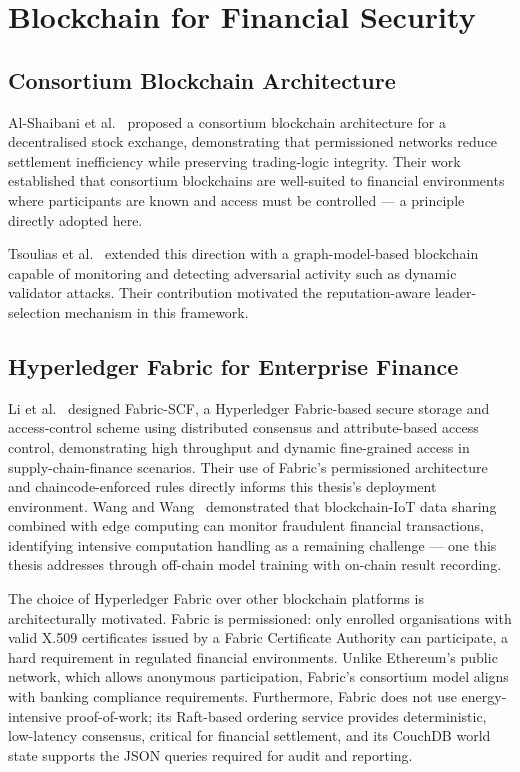 \section{Blockchain for Financial Security}

\subsection{Consortium Blockchain Architecture}

Al-Shaibani et al.~\cite{abdallah2020} proposed a consortium blockchain architecture for a decentralised stock exchange, demonstrating that permissioned networks reduce settlement inefficiency while preserving trading-logic integrity. Their work established that consortium blockchains are well-suited to financial environments where participants are known and access must be controlled --- a principle directly adopted here.

Tsoulias et al.~\cite{tsoulias2020} extended this direction with a graph-model-based blockchain capable of monitoring and detecting adversarial activity such as dynamic validator attacks. Their contribution motivated the reputation-aware leader-selection mechanism in this framework.

\subsection{Hyperledger Fabric for Enterprise Finance}

Li et al.~\cite{li2023} designed Fabric-SCF, a Hyperledger Fabric-based secure storage and access-control scheme using distributed consensus and attribute-based access control, demonstrating high throughput and dynamic fine-grained access in supply-chain-finance scenarios. Their use of Fabric's permissioned architecture and chaincode-enforced rules directly informs this thesis's deployment environment. Wang and Wang~\cite{wang2022} demonstrated that blockchain-IoT data sharing combined with edge computing can monitor fraudulent financial transactions, identifying intensive computation handling as a remaining challenge --- one this thesis addresses through off-chain model training with on-chain result recording.

The choice of Hyperledger Fabric over other blockchain platforms is architecturally motivated. Fabric is permissioned: only enrolled organisations with valid X.509 certificates issued by a Fabric Certificate Authority can participate, a hard requirement in regulated financial environments. Unlike Ethereum's public network, which allows anonymous participation, Fabric's consortium model aligns with banking compliance requirements. Furthermore, Fabric does not use energy-intensive proof-of-work; its Raft-based ordering service provides deterministic, low-latency consensus, critical for financial settlement, and its CouchDB world state supports the JSON queries required for audit and reporting.

